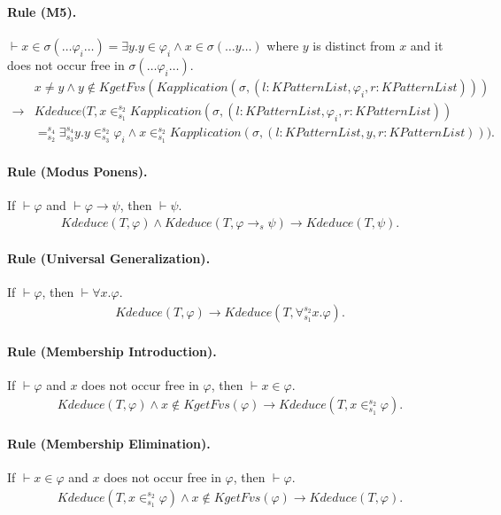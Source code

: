 \documentclass[UTF8,11pt]{article}
\theoremstyle{plain}
\theoremstyle{definition}
\theoremstyle{remark}
\newcommand{\cln}{{:}}
\newcommand{\KPatternList}{\mathit{KPatternList}}
\newcommand{\Kapplication}{\mathit{Kapplication}}
\newcommand{\kand}{\wedge}
\newcommand{\kimplies}{\to}
\newcommand{\kexists}{\exists}
\newcommand{\kforall}{\forall}
\newcommand{\kequals}{=}
\newcommand{\kin}{\in}
\newcommand{\KgetFvs}{\mathit{KgetFvs}}
\newcommand{\Kdeduce}{\mathit{Kdeduce}}
\begin{document}
\paragraph{Rule (M5).}
$\vdash x \in \sigma(\dots \varphi_i \dots) = \exists y . y \in \varphi_i \wedge x \in \sigma(\dots y \dots)$ where $y$ is distinct from $x$ and it does not occur free in $\sigma(\dots \varphi_i \dots)$.
\begin{align*}
&x \neq y \wedge y \not\in \KgetFvs(\Kapplication(\sigma, (l\cln\KPatternList, \varphi_i, r\cln\KPatternList)))
\\
\to&\Kdeduce(T, x \kin_{s_1}^{s_2} \Kapplication(\sigma, (l\cln\KPatternList, 
\varphi_i, r\cln\KPatternList))
\\
&\kequals_{s_2}^{s_4} \kexists_{s_3}^{s_4} y . y \kin_{s_3}^{s_2} \varphi_i 
\kand x 
\kin_{s_1}^{s_2} 
\Kapplication(\sigma, (l\cln\KPatternList, y, r\cln\KPatternList))).
\end{align*}

\paragraph{Rule (Modus Ponens).}
If $\vdash \varphi$ and $\vdash \varphi \to \psi$, then $\vdash \psi$.
\begin{align*}
\Kdeduce(T, \varphi) \wedge \Kdeduce(T, \varphi \kimplies_s \psi) \to 
\Kdeduce(T, \psi).
\end{align*}

\paragraph{Rule (Universal Generalization).}
If $\vdash \varphi$, then $\vdash \forall x . \varphi$.
\begin{align*}
\Kdeduce(T, \varphi) \to \Kdeduce(T, \kforall_{s_1}^{s_2} x . \varphi).
\end{align*}

\paragraph{Rule (Membership Introduction).}
If $\vdash \varphi$ and $x$ does not occur free in $\varphi$, then $\vdash x \in \varphi$.
\begin{align*}
\Kdeduce(T, \varphi) \wedge x \not\in \KgetFvs(\varphi) \to \Kdeduce(T, x 
\kin_{s_1}^{s_2} \varphi).
\end{align*}

\paragraph{Rule (Membership Elimination).}
If $\vdash x \in \varphi$ and $x$ does not occur free in $\varphi$, then $\vdash \varphi$.
\begin{align*}
\Kdeduce(T, x \kin_{s_1}^{s_2} \varphi) \wedge x \not\in \KgetFvs(\varphi) \to 
\Kdeduce(T, \varphi).
\end{align*}
\end{document}

